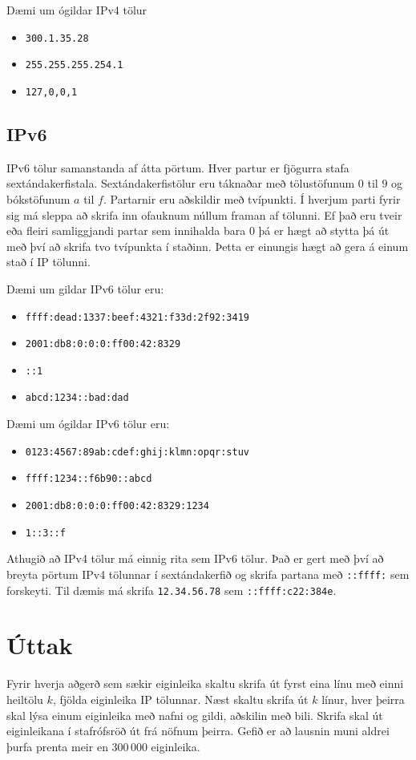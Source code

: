 Dæmi um ógildar IPv4 tölur
\begin{itemize}
	\item \texttt{300.1.35.28}
	\item \texttt{255.255.255.254.1}
	\item \texttt{127,0,0,1}
\end{itemize}


\subsection*{IPv6}
IPv6 tölur samanstanda af átta pörtum.
Hver partur er fjögurra stafa sextándakerfistala.
Sextándakerfistölur eru táknaðar með tölustöfunum $0$ til $9$ og bókstöfunum $a$ til $f$.
Partarnir eru aðskildir með tvípunkti.
Í hverjum parti fyrir sig má sleppa að skrifa inn ofauknum núllum framan af tölunni.
Ef það eru tveir eða fleiri samliggjandi partar sem innihalda bara $0$ þá er hægt að stytta þá út með því að skrifa tvo tvípunkta í staðinn.
Þetta er einungis hægt að gera á einum stað í IP tölunni.

Dæmi um gildar IPv6 tölur eru:
\begin{itemize}
	\item \texttt{ffff:dead:1337:beef:4321:f33d:2f92:3419}
	\item \texttt{2001:db8:0:0:0:ff00:42:8329}
	\item \texttt{::1}
    \item \texttt{abcd:1234::bad:dad}
\end{itemize}

Dæmi um ógildar IPv6 tölur eru:
\begin{itemize}
	\item \texttt{0123:4567:89ab:cdef:ghij:klmn:opqr:stuv}
	\item \texttt{ffff:1234::f6b90::abcd}
	\item \texttt{2001:db8:0:0:0:ff00:42:8329:1234}
    \item \texttt{1::3::f}
\end{itemize}

Athugið að IPv4 tölur má einnig rita sem IPv6 tölur.
Það er gert með því að breyta pörtum IPv4 tölunnar í sextándakerfið
og skrifa partana með \texttt{::ffff:} sem forskeyti.
Til dæmis má skrifa \texttt{12.34.56.78} sem \texttt{::ffff:c22:384e}.

\section*{Úttak}
Fyrir hverja aðgerð sem sækir eiginleika skaltu skrifa út fyrst eina línu með einni heiltölu $k$, fjölda eiginleika IP tölunnar.
Næst skaltu skrifa út $k$ línur, hver þeirra skal lýsa einum eiginleika með nafni og gildi, aðskilin með bili.
Skrifa skal út eiginleikana í stafrófsröð út frá nöfnum þeirra.
Gefið er að lausnin muni aldrei þurfa prenta meir en $300 \, 000$ eiginleika.

